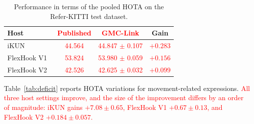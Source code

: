 \documentclass{article}
\begin{document}

\begin{table}
  \centering
  \caption{Performance in terms of the pooled HOTA on the Refer-KITTI test dataset.}
  \label{tab:main}
  \small
  \setlength{\tabcolsep}{2pt}
  \begin{tabular}{lccc}
    \hline
    Host                        & \textcolor{red}{Published} & \textcolor{red}{GMC-Link}           & Gain                      \\
    \hline
    iKUN~\cite{ikun}            & \textcolor{red}{44.564}    & \textcolor{red}{44.847 $\pm$ 0.107} & \textcolor{red}{$+0.283$} \\
    FlexHook V1~\cite{flexhook} & \textcolor{red}{53.824}    & \textcolor{red}{53.980 $\pm$ 0.059} & \textcolor{red}{$+0.156$} \\
    FlexHook V2~\cite{flexhook} & \textcolor{red}{42.526}    & \textcolor{red}{42.625 $\pm$ 0.032} & \textcolor{red}{$+0.099$} \\
    \hline
  \end{tabular}
\end{table}


Table~\ref{tab:deficit} reports HOTA variations for movement-related expressions. \textcolor{red}{All three host settings improve, and the size of the improvement differs by an order of magnitude: iKUN gains $+7.08\pm0.65$, FlexHook V1 $+0.67\pm0.13$, and FlexHook V2 $+0.184\pm0.057$.}


\end{document}
